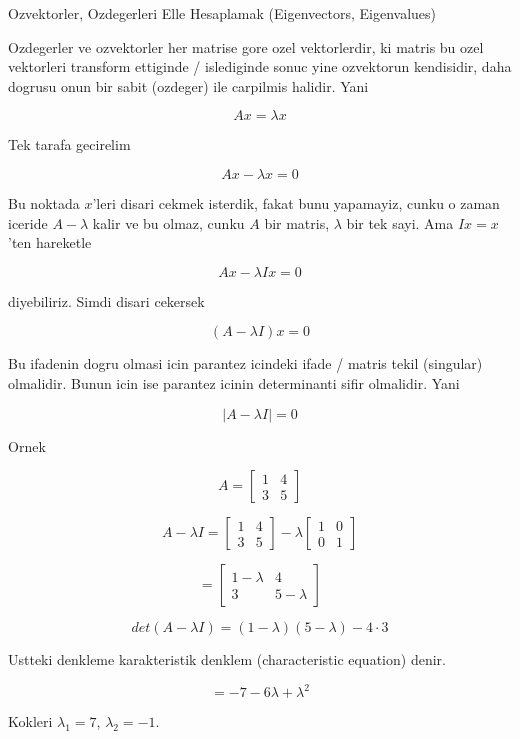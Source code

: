 \documentclass[12pt,fleqn]{article}\usepackage{../common}
\begin{document}
Ozvektorler, Ozdegerleri Elle Hesaplamak (Eigenvectors, Eigenvalues)

Ozdegerler ve ozvektorler her matrise gore ozel vektorlerdir, ki matris bu
ozel vektorleri transform ettiginde / islediginde sonuc yine ozvektorun
kendisidir, daha dogrusu onun bir sabit (ozdeger) ile carpilmis
halidir. Yani

\[ Ax = \lambda x \]

Tek tarafa gecirelim

\[ Ax - \lambda x = 0 \]

Bu noktada $x$'leri disari cekmek isterdik, fakat bunu yapamayiz, cunku o
zaman iceride $A - \lambda$ kalir ve bu olmaz, cunku $A$ bir matris,
$\lambda$ bir tek sayi. Ama $Ix = x$'ten hareketle

\[ Ax - \lambda I x = 0 \]

diyebiliriz. Simdi disari cekersek

\[ (A - \lambda I) x = 0 \]

Bu ifadenin dogru olmasi icin parantez icindeki ifade / matris tekil
(singular) olmalidir. Bunun icin ise parantez icinin determinanti sifir
olmalidir. Yani

\[ |A - \lambda I| = 0 \]

Ornek 

\[ 
A = 
\left[\begin{array}{rr}
1 & 4 \\ 3 & 5
\end{array}\right]
 \]

\[ 
A - \lambda I = 
\left[\begin{array}{rr}
1 & 4 \\ 3 & 5
\end{array}\right] - 
\lambda
\left[\begin{array}{rr}
1 & 0 \\ 0 & 1
\end{array}\right] 
 \]

\[ 
= 
\left[\begin{array}{rr}
1 - \lambda & 4 \\ 3 & 5-\lambda
\end{array}\right]
 \]

\[ det(A - \lambda I) = (1-\lambda)(5-\lambda) - 4 \cdot 3 \]

Ustteki denkleme karakteristik denklem (characteristic equation) denir. 

\[ = -7 -6\lambda + \lambda^2 \]

Kokleri $\lambda_1 = 7$, $\lambda_2 = -1$.
\end{document}
